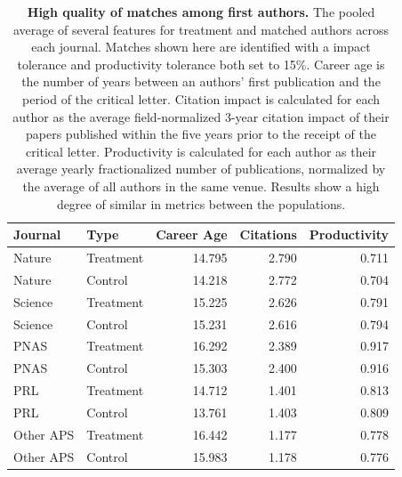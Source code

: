 \documentclass[12pt]{article} %
\begin{document}
\clearpage
\begin{landscape}
\begin{table}[p]
\centering
\caption{
\textbf{High quality of matches among first authors.}
The pooled average of several features for treatment and matched authors across each journal. 
Matches shown here are identified with a impact tolerance and productivity tolerance both set to 15\%.
Career age is the number of years between an authors' first publication and the period of the critical letter. 
Citation impact is calculated for each author as the average field-normalized 3-year citation impact of their papers published within the five years prior to the receipt of the critical letter.
Productivity is calculated for each author as their average yearly fractionalized number of publications, normalized by the average of all authors in the same venue.
Results show a high degree of similar in metrics between the populations.
}
\label{si:tab:first-author-match-quality}
\begin{tabular}{llrrr}
  \toprule
Journal & Type & Career Age & Citations & Productivity \\ 
  \midrule
Nature & Treatment & 14.795 & 2.790 & 0.711 \\ 
  Nature & Control & 14.218 & 2.772 & 0.704 \\ 
  Science & Treatment & 15.225 & 2.626 & 0.791 \\ 
  Science & Control & 15.231 & 2.616 & 0.794 \\ 
  PNAS & Treatment & 16.292 & 2.389 & 0.917 \\ 
  PNAS & Control & 15.303 & 2.400 & 0.916 \\ 
  PRL & Treatment & 14.712 & 1.401 & 0.813 \\ 
  PRL & Control & 13.761 & 1.403 & 0.809 \\ 
  Other APS & Treatment & 16.442 & 1.177 & 0.778 \\ 
  Other APS & Control & 15.983 & 1.178 & 0.776 \\ 
   \bottomrule
\end{tabular}
\end{table}
\end{landscape}
\end{document}
